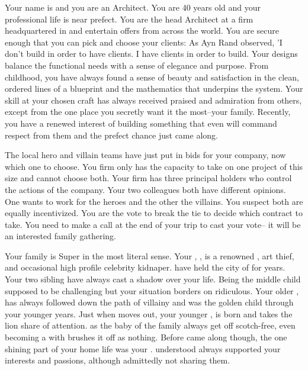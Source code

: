 \documentclass[char]{LRSguildcamp1}
\begin{document}
\name{\cArchitect{}}


Your name is \cArchitect{\intro} and you are an Architect. You are 40 years old and your professional life is near prefect. You are the head Architect at a firm headquartered in \pCityArchitect{} and entertain offers from across the world.  You are secure enough that you can pick and choose your clients: As Ayn Rand observed, 'I don't build in order to have clients. I have clients in order to build. Your designs balance the functional needs with a sense of elegance and purpose. From childhood, you have always found a sense of beauty and satisfaction in the clean, ordered lines of a blueprint and the mathematics that underpins the system. Your skill at your chosen craft has always received praised and admiration from others, except from the one place you secretly want it the most--your family. Recently, you have a renewed interest of building something that even will command respect from them and the prefect chance just came along. 

The local hero and villain teams have just put in bids for your company, now which one to choose. You firm only has the capacity to take on one project of this size and cannot choose both.  Your firm has three principal holders who control the actions of the company. Your two colleagues both have different opinions. One wants to work for the heroes and the other the villains. You suspect both are equally incentivized. You are the vote to break the tie to decide which contract to take. You need to make a call at the end of your trip to cast your vote-- it will be an interested family gathering.  

Your family is Super in the most literal sense. Your \cGrandma{\parent}, \cGrandma{}, is a renowned \cGrandma{\villain}, art thief, and occasional high profile celebrity kidnaper. \cGrandma{\They} have held the city of \pCityGrandma{} for years. Your two sibling have always cast a shadow over your life. Being the middle child supposed to be challenging but your situation borders on ridiculous. Your older \cOldest{\sibling}, \cOldest{} has always followed \cGrandma{} down the path of villainy and was the golden child through your younger years. Just when \cOldest{} moves out, your younger \cYoungest{\sibling}, \cYoungest{} is born and takes the lion share of attention. \cYoungest{\They} as the baby of the family always get off scotch-free, even becoming a \cYoungest{\hero} with \cGrandma{} brushes it off as nothing. Before \cYoungest{} came along though, the one shining part of your home life was your \cGS{\parent} \cGS{}. \cGS{} understood always supported your interests and passions, although admittedly not sharing them. 
\end{document}
